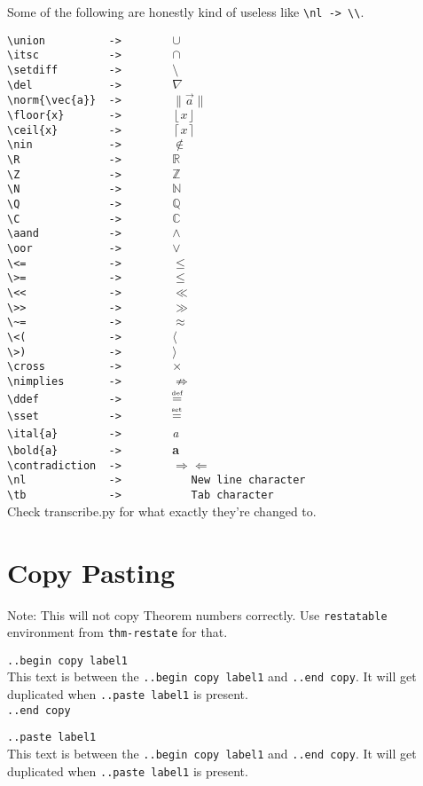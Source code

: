 \documentclass[12pt]{article}
\newcommand{\union}{\cup}
\newcommand{\itsc}{\cap}
\newcommand{\setdiff}{\setminus}
\newcommand{\del}{\nabla}
\newcommand{\Q}{\mathbb{Q}}
\newcommand{\R}{\mathbb{R}}
\newcommand{\Z}{\mathbb{Z}}
\newcommand{\N}{\mathbb{N}}
\newcommand{\C}{\mathbb{C}}
\newcommand{\nin}{\notin}
\newcommand{\ital}{\emph}
\newcommand{\contradiction}{$\Rightarrow\Leftarrow$}
\newcommand{\aand}{\wedge}
\newcommand{\oor}{\vee}
\newcommand{\cross}{\times}
\newcommand{\nimplies}{\nRightarrow}
\newcommand{\nl}{\\}
\newcommand{\tb}{\quad}
\newcommand{\norm}[1]{\|#1\|}
\newcommand{\ddef}{\mathrel{\stackrel{\makebox[0pt]{\mbox{\normalfont\tiny def}}}{=}}}
\newcommand{\sset}{\mathrel{\stackrel{\makebox[0pt]{\mbox{\normalfont\tiny set}}}{=}}}
\newcommand{\floor}[1]{\left\lfloor #1 \right\rfloor}
\newcommand{\ceil}[1]{\left\lceil #1 \right\rceil}
\renewcommand\bold{\textbf}
\numberwithin{equation}{section}
\begin{document}
\begin{flushleft}
\medskip

Some of the following are honestly kind of useless like \verb|\nl -> \\|.

\verb|\union          ->        |$\union$\nl
\verb|\itsc           ->        |$\itsc$\nl
\verb|\setdiff        ->        |$\setdiff$\nl
\verb|\del            ->        |$\del$\nl
\verb|\norm{\vec{a}}  ->        |$\norm{\vec{a}}$\nl
\verb|\floor{x}       ->        |$\floor{x}$\nl
\verb|\ceil{x}        ->        |$\ceil{x}$\nl
\verb|\nin            ->        |$\nin$\nl
\verb|\R              ->        |$\R$\nl
\verb|\Z              ->        |$\Z$\nl
\verb|\N              ->        |$\N$\nl
\verb|\Q              ->        |$\Q$\nl
\verb|\C              ->        |$\C$\nl
\verb|\aand           ->        |$\aand$\nl
\verb|\oor            ->        |$\oor$\nl
\verb|\<=             ->        |$\leq$\nl
\verb|\>=             ->        |$\leq$\nl
\verb|\<<             ->        |$\ll$\nl
\verb|\>>             ->        |$\gg$\nl
\verb|\~=             ->        |$\approx$\nl
\verb|\<(             ->        |$\langle$\nl
\verb|\>)             ->        |$\rangle$\nl
\verb|\cross          ->        |$\cross$\nl
\verb|\nimplies       ->        |$\nimplies$\nl
\verb|\ddef           ->        |$\ddef$\nl
\verb|\sset           ->        |$\sset$\nl
\bigskip
\verb|\ital{a}        ->        |\ital{a}\nl
\verb|\bold{a}        ->        |\bold{a}\nl
\verb|\contradiction  ->        |\contradiction \nl
\verb|\nl             ->           New line character|\nl
\verb|\tb             ->           Tab character|\nl
\bigskip
Check transcribe.py for what exactly they're changed to.

\newpage

\section{Copy Pasting}
Note: This will not copy Theorem numbers correctly. Use \verb|restatable| environment from \verb|thm-restate| for that.

\bigskip

\verb|..begin copy label1| \nl
This text is between the \verb|..begin copy label1| and \verb|..end copy|. It will get duplicated when \verb|..paste label1| is present. \nl
\verb|..end copy|

\bigskip

\verb|..paste label1| \nl
This text is between the \verb|..begin copy label1| and \verb|..end copy|. It will get duplicated when \verb|..paste label1| is present. \nl


\end{flushleft}
\end{document}
